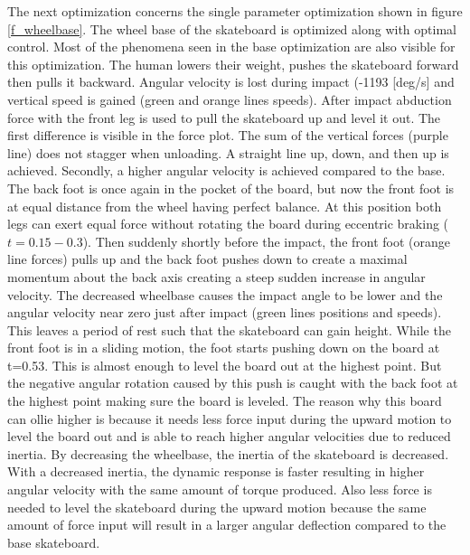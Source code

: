 \documentclass[default,iicol]{sn-jnl}
\begin{document}
\noindent The next optimization concerns the single parameter optimization shown in figure \ref{f_wheelbase}. The wheel base of the skateboard is optimized along with optimal control. Most of the phenomena seen in the base optimization are also visible for this optimization. The human lowers their weight, pushes the skateboard forward then pulls it backward. Angular velocity is lost during impact (-1193 [deg/s] and vertical speed is gained (green and orange lines speeds). After impact abduction force with the front leg is used to pull the skateboard up and level it out. The first difference is visible in the force plot. The sum of the vertical forces (purple line) does not stagger when unloading. A straight line up, down, and then up is achieved. Secondly, a higher angular velocity is achieved compared to the base. The back foot is once again in the pocket of the board, but now the front foot is at equal distance from the wheel having perfect balance. At this position both legs can exert equal force without rotating the board during eccentric braking ($t=0.15 - 0.3$). Then suddenly shortly before the impact, the front foot (orange line forces) pulls up and the back foot pushes down to create a maximal momentum about the back axis creating a steep sudden increase in angular velocity. The decreased wheelbase causes the impact angle to be lower and the angular velocity near zero just after impact (green lines positions and speeds). This leaves a period of rest such that the skateboard can gain height. While the front foot is in a sliding motion, the foot starts pushing down on the board at t=0.53.  This is almost enough to level the board out at the highest point. But the negative angular rotation caused by this push is caught with the back foot at the highest point making sure the board is leveled. 
The reason why this board can ollie higher is because it needs less force input during the upward motion to level the board out and is able to reach higher angular velocities due to reduced inertia. By decreasing the wheelbase, the inertia of the skateboard is decreased. With a decreased inertia, the dynamic response is faster resulting in higher angular velocity with the same amount of torque produced. Also less force is needed to level the skateboard during the upward motion because the same amount of force input will result in a larger angular deflection compared to the base skateboard. 
\end{document}
